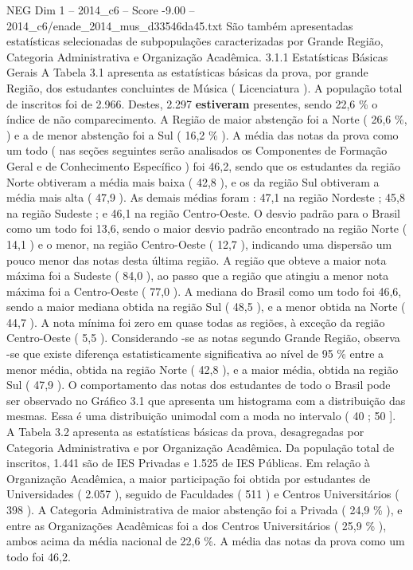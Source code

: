 \begin{textsample}{NEG Dim 1 – 2014\_c6 – Score -9.00 – 2014\_c6/enade\_2014\_mus\_d33546da45.txt}
São também apresentadas estatísticas selecionadas de subpopulações caracterizadas por Grande Região, Categoria Administrativa e Organização Acadêmica. 3.1.1 Estatísticas Básicas Gerais A Tabela 3.1 apresenta as estatísticas básicas da prova, por grande Região, dos estudantes concluintes de Música ( Licenciatura ).
A população total de inscritos foi de 2.966.
Destes, 2.297 \textbf{estiveram} presentes, sendo 22,6 \% o índice de não comparecimento.
A Região de maior abstenção foi a Norte ( 26,6 \%, ) e a de menor abstenção foi a Sul ( 16,2 \% ).
A média das notas da prova como um todo ( nas seções seguintes serão analisados os Componentes de Formação Geral e de Conhecimento Específico ) foi 46,2, sendo que os estudantes da região Norte obtiveram a média mais baixa ( 42,8 ), e os da região Sul obtiveram a média mais alta ( 47,9 ).
As demais médias foram : 47,1 na região Nordeste ; 45,8 na região Sudeste ; e 46,1 na região Centro-Oeste.
O desvio padrão para o Brasil como um todo foi 13,6, sendo o maior desvio padrão encontrado na região Norte ( 14,1 ) e o menor, na região Centro-Oeste ( 12,7 ), indicando uma dispersão um pouco menor das notas desta última região.
A região que obteve a maior nota máxima foi a Sudeste ( 84,0 ), ao passo que a região que atingiu a menor nota máxima foi a Centro-Oeste ( 77,0 ).
A mediana do Brasil como um todo foi 46,6, sendo a maior mediana obtida na região Sul ( 48,5 ), e a menor obtida na Norte ( 44,7 ).
A nota mínima foi zero em quase todas as regiões, à exceção da região Centro-Oeste ( 5,5 ).
Considerando -se as notas segundo Grande Região, observa -se que existe diferença estatisticamente significativa ao nível de 95 \% entre a menor média, obtida na região Norte ( 42,8 ), e a maior média, obtida na região Sul ( 47,9 ).
O comportamento das notas dos estudantes de todo o Brasil pode ser observado no Gráfico 3.1 que apresenta um histograma com a distribuição das mesmas.
Essa é uma distribuição unimodal com a moda no intervalo ( 40 ; 50 ].
A Tabela 3.2 apresenta as estatísticas básicas da prova, desagregadas por Categoria Administrativa e por Organização Acadêmica.
Da população total de inscritos, 1.441 são de IES Privadas e 1.525 de IES Públicas.
Em relação à Organização Acadêmica, a maior participação foi obtida por estudantes de Universidades ( 2.057 ), seguido de Faculdades ( 511 ) e Centros Universitários ( 398 ).
A Categoria Administrativa de maior abstenção foi a Privada ( 24,9 \% ), e entre as Organizações Acadêmicas foi a dos Centros Universitários ( 25,9 \% ), ambos acima da média nacional de 22,6 \%.
A média das notas da prova como um todo foi 46,2.

\end{textsample}

